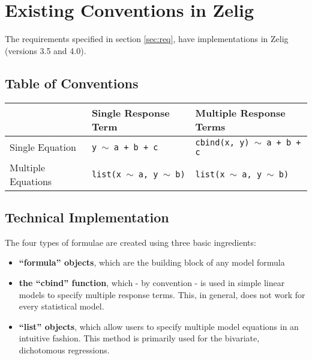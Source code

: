 \documentclass{article}
\newcommand{\tweedly}[0]{$\sim${ }}
\begin{document}
%
%
\pagebreak

%
%
%
\section{Existing Conventions in Zelig}
\label{sec:existing-zelig}

The requirements specified in section \ref{sec:req}, have implementations
in Zelig (versions 3.5 and 4.0).


\subsection{Table of Conventions}

{\noindent}\begin{tabular}{|l|l|l|}

  \hline

  & Single Response Term & Multiple Response Terms \\ \hline

  Single Equation &
  {\tt y \tweedly a + b + c} & {\tt cbind(x, y) \tweedly a + b + c}
  \\ \hline

  Multiple Equations & 
  {\tt list(x \tweedly a, y \tweedly b)} &
  {\tt list(x \tweedly a, y \tweedly b)} \\ \hline


\end{tabular}

\subsection{Technical Implementation}

The four types of formulae are created using three basic ingredients:

\begin{itemize}

  \item {\bf ``formula'' objects}, which are the building block of any model
    formula

  \item {\bf the ``cbind'' function}, which - by convention - is used in simple
    linear models to specify multiple response terms. This, in general, does not
    work for every statistical model.

  \item {\bf ``list'' objects}, which allow users to specify multiple
    model equations in an intuitive fashion. This method is primarily used for
    the bivariate, dichotomous regressions.

\end{itemize}
\end{document}
